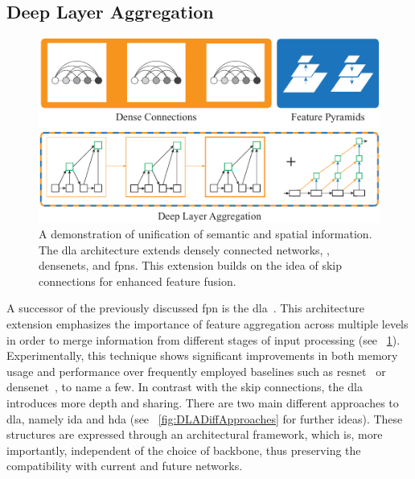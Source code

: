 \subsection{Deep Layer Aggregation}
\label{ssec:DeepLayerAggregation}

\begin{figure}[t]
    \centerline{\includegraphics[width=0.7\linewidth]{figures/theoretical_foundations/dla_comparison.pdf}}
    \caption[\Gls{dla} comparison]{A demonstration of unification of semantic and spatial information. The \gls{dla} architecture extends densely connected networks, \ietext{}, \glspl{densenet}, and \glspl{fpn}. This extension builds on the idea of skip connections for enhanced feature fusion. }
    \label{fig:DLAMotivation}
\end{figure}

A successor of the previously discussed \gls{fpn} is the \gls{dla}~\cite{yu2019dla}. This architecture extension emphasizes the importance of feature aggregation across multiple levels in order to merge information from different stages of input processing (see \figtext{}~\ref{fig:DLAMotivation}). Experimentally, this technique shows significant improvements in both memory usage and performance over frequently employed baselines such as \gls{resnet}~\cite{he2015resnet} or \gls{densenet}~\cite{huang2018densenet}, to name a few. In contrast with the skip connections, the \gls{dla} introduces more depth and sharing. There are two main different approaches to \gls{dla}, namely \gls{ida} and \gls{hda} (see \figtext{}~\ref{fig:DLADiffApproaches} for further ideas). These structures are expressed through an architectural framework, which is, more importantly, independent of the choice of backbone, thus preserving the compatibility with current and future networks.

